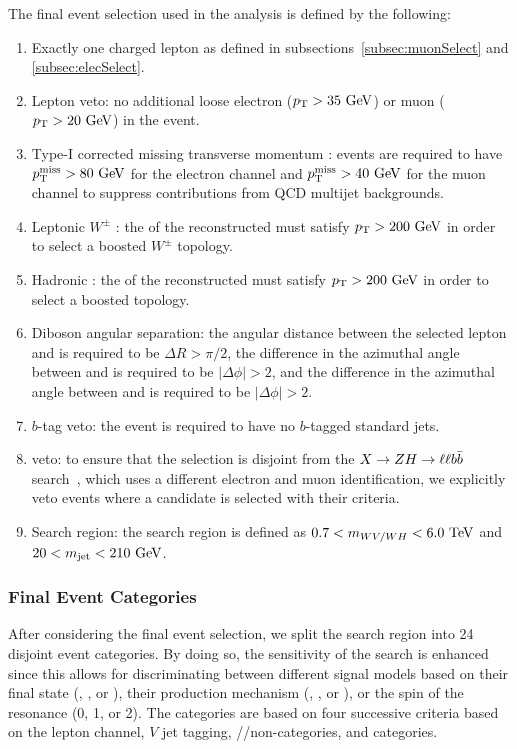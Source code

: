 The final event selection used in the analysis is defined by the following:
\begin{enumerate}
  \item Exactly one charged lepton as defined in subsections~\ref{subsec:muonSelect} and \ref{subsec:elecSelect}.
  \item Lepton veto: no additional loose electron ($\pt>35\unit{GeV}$) or muon ($\pt>20\unit{GeV}$) in the event.
  \item Type-I corrected missing transverse momentum \ptmissTI: events are required to have $\ptmiss>80\unit{GeV}$ for the electron channel and $\ptmiss>40\unit{GeV}$ for the muon channel to suppress contributions from QCD multijet backgrounds.
  \item Leptonic $W^\pm$ \pt: the \pt of the reconstructed \Wlep must satisfy $\pt>200\unit{GeV}$ in order to select a boosted $W^\pm$ topology.
  \item Hadronic \VorH \pt: the \pt of the reconstructed \Vhad must satisfy $\pt>200\unit{GeV}$ in order to select a boosted \VorH topology.
  \item Diboson angular separation: the angular distance between the selected lepton and \Vhad is required to be $\Delta R>\pi/2$, the difference in the azimuthal angle between \Vhad and \ptmissTI is required to be $|\Delta\phi|>2$, and the difference in the azimuthal angle between \Vhad and \Wlep is required to be $|\Delta\phi|>2$.
  \item $b$-tag veto: the event is required to have no $b$-tagged standard jets.
  \item \ZH veto: to ensure that the selection is disjoint from the $X\to\ZH\to\ell\ell\bbbar$ search~\cite{CMS-PAS-B2G-19-006}, which uses a different electron and muon identification, we explicitly veto events where a \ZH candidate is selected with their criteria.
  \item Search region: the search region is defined as $0.7<\MVV<6.0\unit{TeV}$ and $20<\MJ<210\unit{GeV}$.
\end{enumerate}

\subsubsection{Final Event Categories}
\label{subsec:eventCat}

After considering the final event selection, we split the search region into 24 disjoint event categories.
By doing so, the sensitivity of the search is enhanced since this allows for discriminating between different signal models based on their final state (\WW, \WZ, or \WH), their production mechanism (\ggF, \DY, or \VBF), or the spin of the resonance (0, 1, or 2).
The categories are based on four successive criteria based on the lepton channel, $V$ jet tagging, \VBF/\bbbar/non-\bbbar categories, and \Dy categories.

